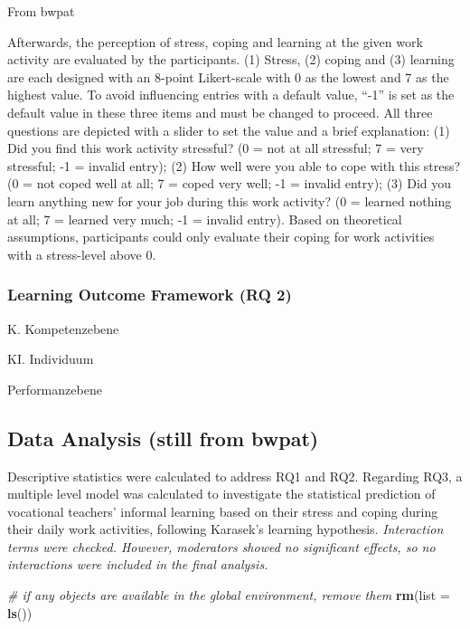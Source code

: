 \documentclass[
]{article}
\newenvironment{Shaded}{\begin{snugshade}}{\end{snugshade}}
\newcommand{\AttributeTok}[1]{\textcolor[rgb]{0.13,0.29,0.53}{#1}}
\newcommand{\CommentTok}[1]{\textcolor[rgb]{0.56,0.35,0.01}{\textit{#1}}}
\newcommand{\FunctionTok}[1]{\textcolor[rgb]{0.13,0.29,0.53}{\textbf{#1}}}
\newcommand{\NormalTok}[1]{#1}
\begin{document}
From bwpat

Afterwards, the perception of stress, coping and learning at the given
work activity are evaluated by the participants. (1) Stress, (2) coping
and (3) learning are each designed with an 8-point Likert-scale with 0
as the lowest and 7 as the highest value. To avoid influencing entries
with a default value, ``-1'' is set as the default value in these three
items and must be changed to proceed. All three questions are depicted
with a slider to set the value and a brief explanation: (1) Did you find
this work activity stressful? (0 = not at all stressful; 7 = very
stressful; -1 = invalid entry); (2) How well were you able to cope with
this stress? (0 = not coped well at all; 7 = coped very well; -1 =
invalid entry); (3) Did you learn anything new for your job during this
work activity? (0 = learned nothing at all; 7 = learned very much; -1 =
invalid entry). Based on theoretical assumptions, participants could
only evaluate their coping for work activities with a stress-level above
0.

\subsubsection{Learning Outcome Framework (RQ
2)}\label{learning-outcome-framework-rq-2}

K. Kompetenzebene

KI. Individuum

Performanzebene

\subsection{Data Analysis (still from
bwpat)}\label{data-analysis-still-from-bwpat}

Descriptive statistics were calculated to address RQ1 and RQ2. Regarding
RQ3, a multiple level model was calculated to investigate the
statistical prediction of vocational teachers' informal learning based
on their stress and coping during their daily work activities, following
Karasek's learning hypothesis. \emph{Interaction terms were checked.
However, moderators showed no significant effects, so no interactions
were included in the final analysis.}

\begin{Shaded}
\begin{Highlighting}[]
\CommentTok{\# if any objects are available in the global environment, remove them}
\FunctionTok{rm}\NormalTok{(}\AttributeTok{list =} \FunctionTok{ls}\NormalTok{())}
\end{Highlighting}
\end{Shaded}
\end{document}
